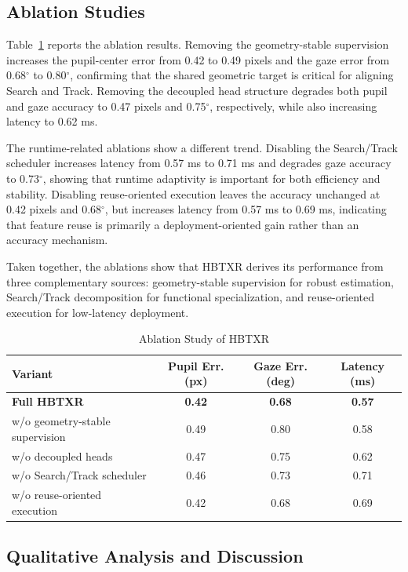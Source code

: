﻿\documentclass[journal]{IEEEtran}
\begin{document}
\subsection{Ablation Studies}

Table~\ref{tab:ablation} reports the ablation results. Removing the geometry-stable supervision increases the pupil-center error from 0.42 to 0.49 pixels and the gaze error from 0.68$^\circ$ to 0.80$^\circ$, confirming that the shared geometric target is critical for aligning Search and Track. Removing the decoupled head structure degrades both pupil and gaze accuracy to 0.47 pixels and 0.75$^\circ$, respectively, while also increasing latency to 0.62 ms.

The runtime-related ablations show a different trend. Disabling the Search/Track scheduler increases latency from 0.57 ms to 0.71 ms and degrades gaze accuracy to 0.73$^\circ$, showing that runtime adaptivity is important for both efficiency and stability. Disabling reuse-oriented execution leaves the accuracy unchanged at 0.42 pixels and 0.68$^\circ$, but increases latency from 0.57 ms to 0.69 ms, indicating that feature reuse is primarily a deployment-oriented gain rather than an accuracy mechanism.

Taken together, the ablations show that HBTXR derives its performance from three complementary sources: geometry-stable supervision for robust estimation, Search/Track decomposition for functional specialization, and reuse-oriented execution for low-latency deployment.

\begin{table}[!t]
\caption{Ablation Study of HBTXR}
\label{tab:ablation}
\centering
\footnotesize
\begin{tabular}{lccc}
\toprule
Variant & Pupil Err. (px) & Gaze Err. (deg) & Latency (ms) \\
\midrule
\textbf{Full HBTXR} & \textbf{0.42} & \textbf{0.68} & \textbf{0.57} \\
w/o geometry-stable supervision & 0.49 & 0.80 & 0.58 \\
w/o decoupled heads & 0.47 & 0.75 & 0.62 \\
w/o Search/Track scheduler & 0.46 & 0.73 & 0.71 \\
w/o reuse-oriented execution & 0.42 & 0.68 & 0.69 \\
\bottomrule
\end{tabular}
\end{table}

\subsection{Qualitative Analysis and Discussion}
\end{document}
